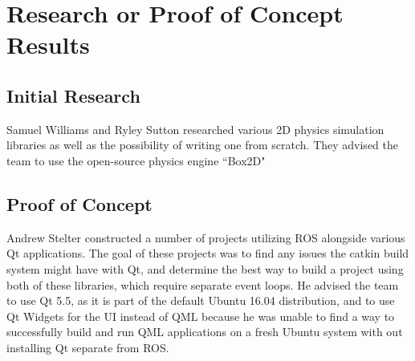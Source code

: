 \section{Research or Proof of Concept Results}
\subsection{Initial Research}
Samuel Williams and Ryley Sutton researched various 2D physics simulation libraries as well as the possibility of writing one from scratch. They advised the team to use the open-source physics engine ``Box2D"

\subsection{Proof of Concept}
Andrew Stelter constructed a number of projects utilizing ROS alongside various Qt applications. The goal of these projects was to find any issues the catkin build system might have with Qt, and determine the best way to build a project using both of these libraries, which require separate event loops. He advised the team to use Qt 5.5, as it is part of the default Ubuntu 16.04 distribution, and to use Qt Widgets for the UI instead of QML because he was unable to find a way to successfully build and run QML applications on a fresh Ubuntu system with out installing Qt separate from ROS.


